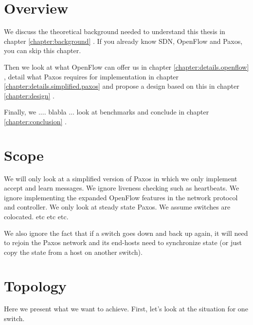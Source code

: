 \section{Overview}

We discuss the theoretical background needed to understand this thesis in
chapter \ref{chapter:background} .  If you already know \acs{SDN},
OpenFlow and Paxos, you can skip this chapter.

Then we look at what OpenFlow can offer us in chapter
\ref{chapter:details.openflow}
, detail what Paxos requires for
implementation in chapter \ref{chapter:details.simplified.paxos} 
 and propose a
design based on this in chapter \ref{chapter:design} .

Finally, we .... blabla ... look at benchmarks and conclude in chapter
\ref{chapter:conclusion} .

\section{Scope}


We will only look at a simplified version of Paxos in which we only
implement accept and learn messages. We ignore liveness checking such as
heartbeats. We ignore implementing the expanded OpenFlow features in the
network protocol and controller. We only look at steady state Paxos.
We assume switches are colocated. etc etc etc.

We also ignore the fact that if a switch goes down and back up again, it
will need to rejoin the Paxos network and its end-hosts need to synchronize
state (or just copy the state from a host on another switch).

\section{Topology}


Here we present what we want to achieve.  First, let's look at the situation
for one switch.

